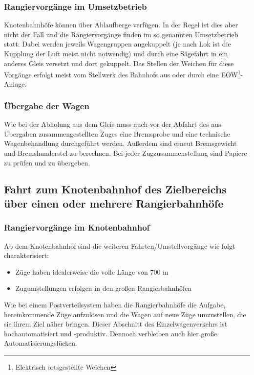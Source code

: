 \subsubsection{Rangiervorgänge im Umsetzbetrieb}\label{sec:Rangierfahrt}
Knotenbahnhöfe können über \gls{Ablaufberg}e verfügen. In der Regel ist dies aber nicht der Fall und die Rangiervorgänge finden im so genannten Umsetzbetrieb statt. Dabei werden jeweils Wagengruppen angekuppelt (je nach Lok ist die Kupplung der Luft meist nicht notwendig) und durch eine Sägefahrt in ein anderes Gleis versetzt und dort gekuppelt. Das Stellen der Weichen für diese Vorgänge erfolgt meist vom Stellwerk des Bahnhofs aus oder durch eine \gls{EOW}\footnote{Elektrisch ortsgestellte Weichen}-Anlage.
\subsubsection{Übergabe der Wagen}\label{sec:UEdWagen}
Wie bei der Abholung aus dem Gleis muss auch vor der Abfahrt des aus Übergaben zusammengestellten Zuges eine \gls{Bremsprobe} und eine technische Wagenbehandlung durchgeführt werden. Außerdem sind erneut Bremsgewicht und Bremshunderstel zu berechnen. Bei jeder Zugzusammenstellung sind Papiere zu prüfen und zu übergeben.

\subsection{Fahrt zum Knotenbahnhof des Zielbereichs über einen oder mehrere Rangierbahnhöfe}
\subsubsection{Rangiervorgänge im Knotenbahnhof}\label{sec:RangKnoten}
Ab dem \gls{Knotenbahnhof} sind die weiteren Fahrten/Umstellvorgänge wie folgt charakterisiert:
\begin{itemize}
    \item Züge haben idealerweise die volle Länge von 700 m
    \item Zugumstellungen erfolgen in den großen Rangierbahnhöfen
\end{itemize}
Wie bei einem Postverteilsystem haben die Rangierbahnhöfe die Aufgabe, hereinkommende Züge aufzulösen und die Wagen auf neue Züge umzustellen, die sie ihrem Ziel näher bringen. Dieser Abschnitt des Einzelwagenverkehrs ist hochautomatisiert und -produktiv. Dennoch verbleiben auch hier große Automatisierungslücken. 
